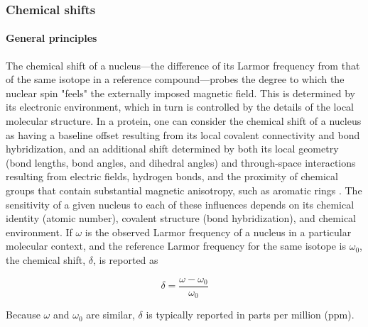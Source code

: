 \documentclass[9pt,review]{livecoms}
\begin{document}
\subsubsection{Chemical shifts}
\label{sub2:chem_shift}

\paragraph{General principles}

The chemical shift of a nucleus---the difference of its Larmor frequency from that of the same isotope in a reference compound---probes the degree to which the nuclear spin "feels" the externally imposed magnetic field.
This is determined by its electronic environment, which in turn is controlled by the details of the local molecular structure.
In a protein, one can consider the chemical shift of a nucleus as having a baseline offset resulting from its local covalent connectivity and bond hybridization, and an additional shift determined by both its local geometry (bond lengths, bond angles, and dihedral angles) and through-space interactions resulting from electric fields, hydrogen bonds, and the proximity of chemical groups that contain substantial magnetic anisotropy, such as aromatic rings \cite{wishart_12_1994,wishart_1_2002,neal_rapid_2003}.
The sensitivity of a given nucleus to each of these influences depends on its chemical identity (atomic number), covalent structure (bond hybridization), and chemical environment.
If $\omega$ is the observed Larmor frequency of a nucleus in a particular molecular context, and the reference Larmor frequency for the same isotope is $\omega_0$, the chemical shift, $\delta$, is reported as

\begin{equation}
\label{eqn:chem_shift}
\delta = \frac {\omega - \omega_0} {\omega_0}
\end{equation}

\noindent Because $\omega$ and $\omega_0$ are similar, $\delta$ is typically reported in parts per million (ppm).
\end{document}

